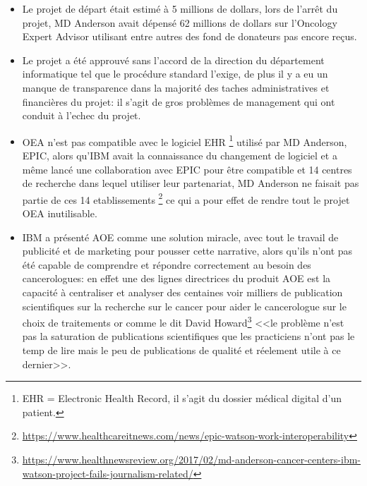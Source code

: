 \begin{itemize}
    \item Le projet de départ était estimé à 5 millions de dollars, lors de l'arrêt du 
    projet, MD Anderson avait dépensé 62 millions de dollars sur l'Oncology 
    Expert Advisor utilisant entre autres des fond de donateurs pas encore reçus. \newline
    
    \item Le projet a été approuvé sans l'accord de la direction du 
    département informatique tel que le procédure standard l'exige, de plus il y a 
    eu un manque de transparence dans la majorité des taches administratives et 
    financières du projet: il s'agit de gros problèmes de management qui ont conduit
    à l'echec du projet.\newline
    
    \item OEA n'est pas compatible avec le logiciel EHR 
    \footnote{
        EHR = Electronic Health Record, il s'agit du dossier médical digital d'un patient.
    } utilisé par MD Anderson, EPIC, alors qu'IBM avait la connaissance du changement 
    de logiciel et a même lancé une collaboration avec EPIC pour être compatible 
    et 14 centres de recherche dans lequel utiliser leur partenariat, 
    MD Anderson ne faisait pas partie de ces 14 etablissements
    \footnote{
        \url{https://www.healthcareitnews.com/news/epic-watson-work-interoperability}
    } ce qui a pour effet de rendre tout le projet OEA inutilisable.
    \newline

    \item IBM a présenté AOE comme une solution miracle, avec tout le travail 
    de publicité et de marketing pour pousser cette narrative, alors qu'ils n'ont
    pas été capable de comprendre et répondre correctement au besoin des cancerologues:
    en effet une des lignes directrices du produit AOE est la capacité à centraliser
    et analyser des centaines voir milliers de publication scientifiques sur la 
    recherche sur le cancer pour aider le cancerologue sur le choix de traitements
    or comme le dit David Howard\footnote{\url{https://www.healthnewsreview.org/2017/02/md-anderson-cancer-centers-ibm-watson-project-fails-journalism-related/}}
    <<le problème n'est pas la saturation de publications scientifiques 
    que les practiciens n'ont pas le temp de lire mais le peu de publications 
    de qualité et réelement utile à ce dernier>>. \newline    
\end{itemize}

